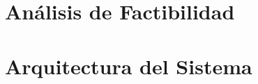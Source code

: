 \chapter{Análisis de Factibilidad} \label{chp:factibilidad}
\chapter{Arquitectura del Sistema} \label{chp:arquitectura}
